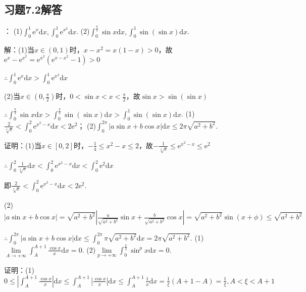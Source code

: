 \documentclass[12pt,UTF8]{ctexart}
\begin{document}
\subsection{习题7.2解答}
\begin{enumerate}
：
\newline
(1)$\int_0^1\mathrm e^x\mathrm dx,\int_0^1\mathrm e^{x^2}\mathrm dx$.
\newline
(2)$\int_0^{\frac\pi2}\sin x\mathrm dx,\int_0^1\sin(\sin x)\mathrm dx$.

解：(1)当$x\in(0,1)$时，$x-x^2=x(1-x)>0$，故$\mathrm e^x-\mathrm e^{x^2}=\mathrm e^{x^2}(\mathrm e^{x-x^2}-1)>0$

$\therefore\int_0^1\mathrm e^x\mathrm dx>\int_0^1\mathrm e^{x^2}\mathrm dx$

(2)当$x\in(0,\frac\pi2)$时，$0<\sin x<x<\frac\pi2$，故$\sin x>\sin(\sin x)$

$\therefore\int_0^{\frac\pi2}\sin x\mathrm dx>\int_0^{\frac\pi2}\sin(\sin x)\mathrm dx>\int_0^1\sin(\sin x)\mathrm dx$.
\newline
(1)$\frac2{\sqrt[4]{\mathrm e}}<\int_0^2\mathrm e^{x^2-x}\mathrm dx<2\mathrm e^2$；
\newline
(2)$\int_0^{2\pi}|a\sin x+b\cos x|\mathrm dx\leq2\pi\sqrt{a^2+b^2}$.

证明：(1)当$x\in[0,2]$时，$-\frac14\leq x^2-x\leq2$，故$-\frac1{\sqrt[4]{\mathrm e}}\leq\mathrm e^{x^2-x}\leq\mathrm e^2$

$\therefore\int_0^2\frac1{\sqrt[4]{\mathrm e}}\mathrm dx<\int_0^2\mathrm e^{x^2-x}\mathrm dx<\int_0^2\mathrm e^2\mathrm dx$

即$\frac2{\sqrt[4]{\mathrm e}}<\int_0^2\mathrm e^{x^2-x}\mathrm dx<2\mathrm e^2$.

(2)$|a\sin x+b\cos x|=\sqrt{a^2+b^2}|\frac a{\sqrt{a^2+b^2}}\sin x+\frac b{\sqrt{a^2+b^2}}\cos x|=\sqrt{a^2+b^2}\sin(x+\phi)\leq\sqrt{a^2+b^2}$

$\therefore\int_0^{2\pi}|a\sin x+b\cos x|\mathrm dx\leq\int_0^{2\pi}\pi\sqrt{a^2+b^2}\mathrm dx=2\pi\sqrt{a^2+b^2}$.
\newline
(1)$\lim\limits_{A\rightarrow+\infty}\int_A^{A+1}\frac{\cos x}x\mathrm dx=0$.
\newline
(2)$\lim\limits_{p\rightarrow+\infty}\int_0^{\frac\pi2}\sin^px\mathrm dx=0$.

证明：(1)$0\leq|\int_A^{A+1}\frac{\cos x}x|\mathrm dx\leq\int_A^{A+1}|\frac{\cos x}x|\mathrm dx\leq\int_A^{A+1}\frac1x\mathrm dx=\frac1\xi(A+1-A)=\frac1\xi,A<\xi<A+1$


\end{enumerate}
\end{document}
